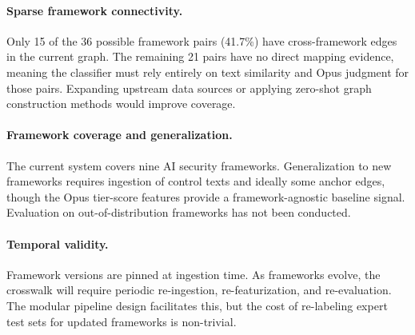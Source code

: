\paragraph{Sparse framework connectivity.}
Only 15 of the 36 possible framework pairs (41.7\%) have cross-framework
edges in the current graph. The remaining 21 pairs have no direct
mapping evidence, meaning the classifier must rely entirely on text
similarity and Opus judgment for those pairs. Expanding upstream data
sources or applying zero-shot graph construction methods would improve
coverage.

\paragraph{Framework coverage and generalization.}
The current system covers nine AI security frameworks. Generalization to
new frameworks requires ingestion of control texts and ideally some
anchor edges, though the Opus tier-score features provide a framework-agnostic
baseline signal. Evaluation on out-of-distribution frameworks has not
been conducted.

\paragraph{Temporal validity.}
Framework versions are pinned at ingestion time. As frameworks evolve,
the crosswalk will require periodic re-ingestion, re-featurization, and
re-evaluation. The modular pipeline design facilitates this, but the
cost of re-labeling expert test sets for updated frameworks is
non-trivial.
